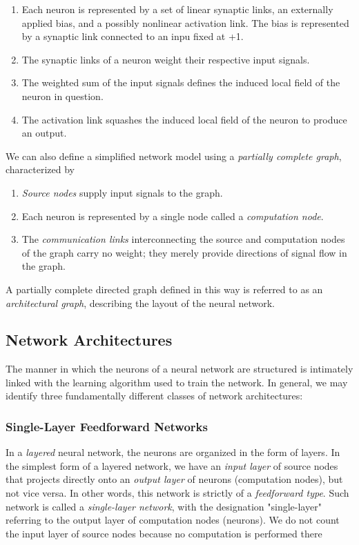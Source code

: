 \documentclass[twocolumn]{article}
\begin{document}
	 \begin{enumerate}
		 \item Each neuron is represented by a set of linear synaptic links, an externally applied bias, and a possibly nonlinear activation link. The bias is represented by a synaptic link connected to an inpu fixed at +1.
		 \item The synaptic links of a neuron weight their respective input signals.
		 \item The weighted sum of the input signals defines the induced local field of the neuron in question.
		 \item The activation link squashes the induced local field of the neuron to produce an output.
	 \end{enumerate}

	 We can also define a simplified network model using a \textit{partially complete graph}, characterized by

	 \begin{enumerate}
		 \item \textit{Source nodes} supply input signals to the graph.
		 \item Each neuron is represented by a single node called a \textit{computation node}.
		 \item The \textit{communication links} interconnecting the source and computation nodes of the graph carry no weight; they merely provide directions of signal flow in the graph.
	 \end{enumerate}

	 A partially complete directed graph defined in this way is referred to as an \textit{architectural graph}, describing the layout of the neural network.

 \subsection{Network Architectures}
	 The manner in which the neurons of a neural network are structured is intimately linked with the learning algorithm used to train the network. In general, we may identify three fundamentally different classes of network architectures:

	 \subsubsection{Single-Layer Feedforward Networks}
		 In a \textit{layered} neural network, the neurons are organized in the form of layers. In the simplest form of a layered network, we have an \textit{input layer} of source nodes that projects directly onto an \textit{output layer} of neurons (computation nodes), but not vice versa. In other words, this network is strictly of a \textit{feedforward type}. Such network is called a \textit{single-layer network}, with the designation "single-layer" referring to the output layer of computation nodes (neurons). We do not count the input layer of source nodes because no computation is performed there
\end{document}
